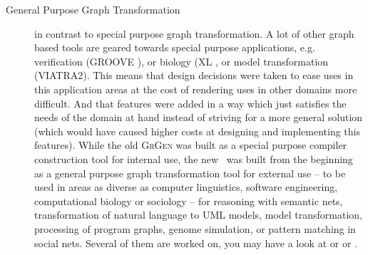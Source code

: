 \begin{description}
\item[General Purpose Graph Transformation]
in contrast to special purpose graph transformation.
A lot of other graph based tools are geared towards special purpose applications, e.g. verification (GROOVE \cite{Groove}), or biology (XL \cite{xl}, or model transformation (VIATRA2\cite{viatra2}).
This means that design decisions were taken to ease uses in this application areas at the cost of rendering uses in other domains more difficult.
And that features were added in a way which just satisfies the needs of the domain at hand instead of striving for a more general solution (which would have caused higher costs at designing and implementing this features).
While the old \textsc{GrGen} was built as a special purpose compiler construction tool for internal use, the new \GrG\ was built from the beginning as a general purpose graph transformation tool for external use
-- to be used in areas as diverse as computer linguistics, software engineering, computational biology or sociology --
for reasoning with semantic nets, transformation of natural language to UML models,
model transformation, processing of program graphs, genome simulation, or pattern matching in social nets. 
Several of them are worked on, you may have a look at \cite{usecomputerlinguistics} or \cite{usemodeltransformation} or \cite{usegeneexpression}.

\end{description}
